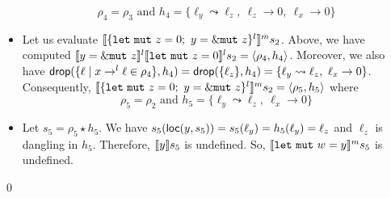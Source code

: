\begin{example}
\begin{itemize}
    \[\rho_4=\rho_3 \text{ and }
    h_4=\{\ell_y\leadsto\ell_z,\ \ell_z\to 0,\ \ell_x\to 0\}\]
    \item Let us evaluate
    $\denl[\{\mathtt{let\ mut}\ z = 0;\ y = \mutborrow z\}^l]{m}{s_2}$.
    Above, we have computed $\denl[y = \mutborrow z]{l}{
    \denl[\mathtt{let\ mut}\ z = 0]{l}{s_2}} = \langle\rho_4,h_4\rangle$.
    Moreover, we also have
    $\drop(\{\ell\mid x\to^l\ell\in\rho_4\},h_4) = \drop(\{\ell_z\},h_4) =
    \{\ell_y\leadsto\ell_z,\ \ell_x\to 0\}$. Consequently,
    $\denl[\{\mathtt{let\ mut}\ z = 0;\ y = \mutborrow z\}^l]{m}{s_2} =
    \langle \rho_5,h_5\rangle$ where
    \[\rho_5 = \rho_2 \text{ and }
    h_5 = \{\ell_y\leadsto\ell_z,\ \ell_x\to 0\}\]
    \item Let $s_5 = \rho_5 \star h_5$.
    We have $s_5(\loc(y,s_5)) = s_5(\ell_y) = h_5(\ell_y) = \ell_z$
    and $\ell_z$ is dangling in $h_5$. Therefore, $\den[y]{s_5}$
    is undefined. So,
    $\denl[\mathtt{let\ mut}\ w = y]{m}{s_5}$ is undefined.
  \end{itemize}
  \qed
\end{example}

